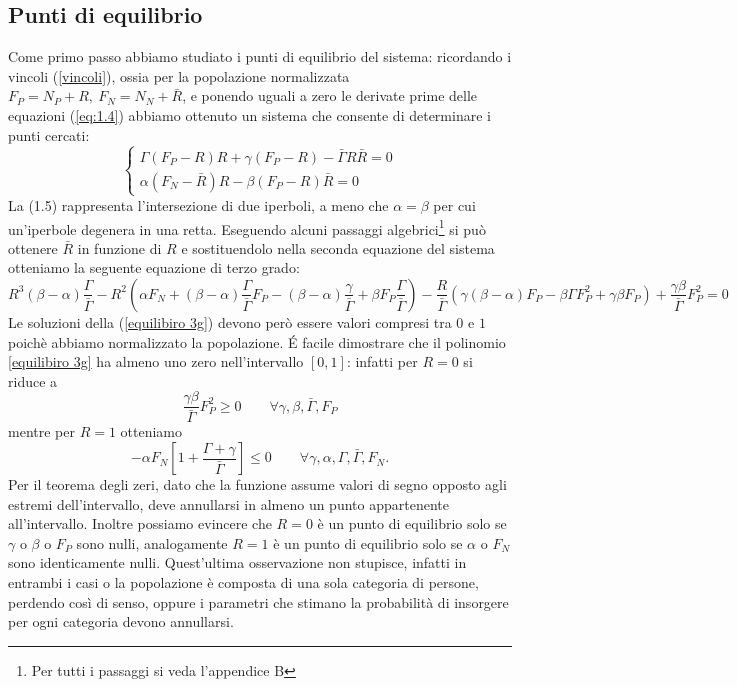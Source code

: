 \subsection{Punti di equilibrio}
Come primo passo abbiamo studiato i punti di equilibrio del sistema: ricordando i vincoli (\ref{vincoli}), ossia per la popolazione normalizzata $
	F_{P}=N_{P}+R ,\ F_{N}=N_{N}+\bar{R}
$, e ponendo uguali a zero le derivate prime delle equazioni (\ref{eq:1.4}) abbiamo ottenuto un sistema che consente di determinare i punti cercati:
\begin{equation}
	\begin{cases}
		\Gamma (F_{P}-R)R+\gamma (F_{P}-R)-\bar{\Gamma}R\bar{R}=0\\
		\alpha (F_{N}-\bar{R})R-\beta (F_{P}-R)\bar{R}=0
	\end{cases}
\end{equation}La (1.5) rappresenta l'intersezione di due iperboli, a meno che $\alpha=\beta$ per cui un'iperbole degenera in una retta.
Eseguendo alcuni passaggi algebrici\footnote{Per tutti i passaggi si veda l'appendice B} si può ottenere $ \bar{R} $ in funzione di $ R $ e sostituendolo nella seconda equazione del sistema otteniamo la seguente equazione di terzo grado:
\begin{equation}
	R^{3}(\beta - \alpha)\frac{\Gamma}{\bar{\Gamma}}-R^{2}\left(\alpha F_{N}+(\beta - \alpha)\frac{\Gamma}{\bar{\Gamma}}F_{P}-(\beta - \alpha)\frac{\gamma}{\bar{\Gamma}}+\beta F_{P}\frac{\Gamma}{\bar{\Gamma}}\right)-\frac{R}{\bar{\Gamma}}\left(\gamma (\beta - \alpha)F_{P}-\beta \Gamma F^{2}_{P}+\gamma\beta F_{P}\right)+\frac{\gamma\beta}{\bar{\Gamma}}F^{2}_{P}
	\label{equilibiro 3g}=0
\end{equation}
Le soluzioni della (\ref{equilibiro 3g}) devono però essere valori compresi tra $0$ e $1$ poichè abbiamo normalizzato la popolazione. \'{E} facile dimostrare che il polinomio \ref{equilibiro 3g} ha almeno uno zero nell'intervallo $ \left[0,1\right] $: infatti per $ R=0 $ si riduce a
\begin{equation}
	\frac{\gamma\beta}{\bar{\Gamma}}F^{2}_{P}\geq0\qquad \forall \gamma, \beta, \bar{\Gamma}, F_{P}
\end{equation}
mentre per $ R=1 $ otteniamo
\begin{equation}
	-\alpha F_{N}\left[1+\frac{\Gamma+ \gamma}{\bar{\Gamma}}\right]\leq0\qquad \forall \gamma, \alpha, \Gamma, \bar{\Gamma}, F_{N}.
\end{equation}
Per il teorema degli zeri, dato che la funzione assume valori di segno opposto agli estremi dell'intervallo, deve annullarsi in almeno un punto appartenente all'intervallo. Inoltre possiamo evincere che $R=0$ è un punto di equilibrio solo se $\gamma$ o $\beta$ o $F_P$ sono nulli, analogamente $R=1$ è un punto di equilibrio solo se $\alpha$ o $F_N$ sono identicamente nulli. Quest'ultima osservazione non stupisce, infatti in entrambi i casi o la popolazione è composta di una sola categoria di persone, perdendo così di senso, oppure i parametri che stimano la probabilità di insorgere per ogni categoria devono annullarsi.
